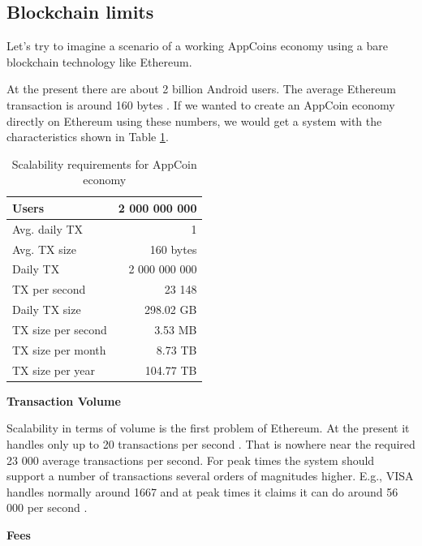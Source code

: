 \subsection{Blockchain limits}


Let's try to imagine a scenario of a working AppCoins economy using a bare blockchain technology like Ethereum.

At the present there are about 2 billion Android users. The average Ethereum transaction is around 160 bytes \cite{EthereumTransactions}. If we wanted to create an AppCoin economy directly on Ethereum using these numbers, we would get a system with the characteristics shown in Table \ref{table:ethereumscalability}.

\begin{table}[!htbp]
\centering
\begin{tabular}{|l|r|}
\hline
Users              & 2 000 000 000    \\ \hline
Avg. daily TX      & 1                \\ \hline
Avg. TX size       & 160 bytes        \\ \hline
Daily TX           & 2 000 000 000    \\ \hline
TX per second      & 23 148           \\ \hline
Daily TX size      & 298.02 GB        \\ \hline
TX size per second & 3.53 MB          \\ \hline
TX size per month  & 8.73 TB          \\ \hline
TX size per year   & 104.77 TB        \\ \hline
\end{tabular}
\caption{Scalability requirements for AppCoin economy}
\label{table:ethereumscalability}
\end{table}

\medskip

{\bf Transaction Volume}

Scalability in terms of volume is the first problem of Ethereum. At the present it handles only up to 20 transactions per second \cite{eth_scaling}. That is nowhere near the required 23 000 average transactions per second. For peak times the system should support a number of transactions several orders of magnitudes higher. E.g., VISA handles normally around 1667 and at peak times it claims it can do around 56 000 per second \cite{eth_scaling}.

\medskip

{\bf Fees}


